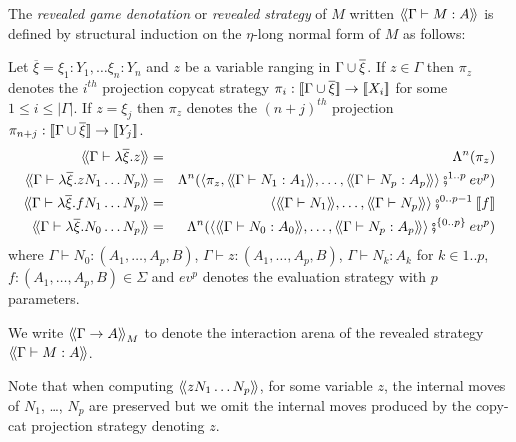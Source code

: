 \begin{dfn}
\label{dfn:interactionstrategy_ofterms}
The \emph{revealed game denotation} or \emph{revealed
strategy} of $M$ written ${\langle\!\langle \Gamma \vdash M : A \rangle\!\rangle}$ is defined by structural induction on the $\eta$-long normal form of $M$ as follows:

Let $\overline{\xi} = \xi_1 : Y_1, \ldots \xi_n : Y_n$
and $z$ be a variable ranging in $\Gamma \cup \overline{\xi}$. If $z\in \Gamma$ then $\pi_{z}$ denotes
the $i^{th}$ projection copycat strategy $\pi_i : {[\![ \Gamma \cup \overline{\xi} ]\!]} \rightarrow {[\![X_i ]\!]}$ for some $1 \leq i \leq |\Gamma|$. If $z = \xi_j$ then
$\pi_{z}$ denotes the $(n+j)^{th}$ projection $\pi_{n+j} : {[\![ \Gamma \cup \overline{\xi} ]\!]} \rightarrow {[\![Y_j ]\!]}$.
\begin{eqnarray*}
\intersem{\Gamma \vdash \lambda \overline{\xi} . z } &=& \Lambda^n(\pi_{z})  \\
\intersem{\Gamma \vdash \lambda \overline{\xi} . z N_1 \ldots N_p} &=& \Lambda^n(\langle \pi_z, \intersem{\Gamma \vdash N_1 : A_1}, \ldots, \intersem{\Gamma \vdash N_p : A_p}  \rangle \fatsemi ^{1..p} ev^p) \\
\intersem{\Gamma \vdash \lambda \overline{\xi}. f N_1 \ldots N_p} &=& \langle \intersem{\Gamma \vdash N_1}, \ldots, \intersem{\Gamma \vdash N_p} \rangle \fatsemi^{0..p-1} \sem{f} \\
\intersem{\Gamma \vdash \lambda \overline{\xi} . N_0 \ldots N_p} &=& \Lambda^n(\langle \intersem{\Gamma \vdash N_0 : A_0}, \ldots, \intersem{\Gamma \vdash N_p : A_p}  \rangle \fatsemi^{\{0..p\}} ev^p)
\end{eqnarray*}
where $\Gamma \vdash N_0 : (A_1,\ldots,A_p,B)$, $\Gamma \vdash z : (A_1,\ldots,A_p,B)$, $\Gamma \vdash N_k : A_k$ for $k\in 1..p$,
$f : (A_1,\ldots,A_p,B) \in \Sigma$ and $ev^p$ denotes the evaluation strategy with $p$ parameters.

We write ${\langle\!\langle \Gamma \rightarrow A \rangle\!\rangle}_M$ to denote the
interaction arena of the revealed strategy ${\langle\!\langle \Gamma \vdash
M : A \rangle\!\rangle}$.
\end{dfn}
Note that when computing ${\langle\!\langle z N_1 \ldots N_p \rangle\!\rangle}$, for some variable $z$, the internal moves of $N_1$, \ldots, $N_p$ are preserved but
we omit the internal moves produced by the copy-cat projection strategy denoting $z$.



